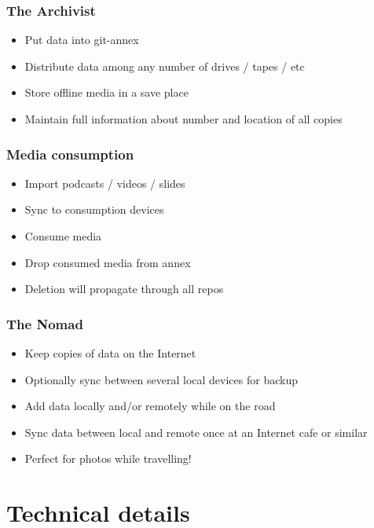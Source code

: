 \documentclass[t]{beamer}
\begin{document}
\begin{frame}
	\frametitle{The Archivist}
	\begin{itemize}
		\item Put data into git-annex
		\item Distribute data among any number of drives / tapes / etc
		\item Store offline media in a save place
		\item Maintain full information about number and location of all copies
	\end{itemize}
\end{frame}

\begin{frame}
	\frametitle{Media consumption}
	\begin{itemize}
		\item Import podcasts / videos / slides
		\item Sync to consumption devices
		\item Consume media
		\item Drop consumed media from annex
		\item Deletion will propagate through all repos
	\end{itemize}
\end{frame}

\begin{frame}
	\frametitle{The Nomad}
	\begin{itemize}
		\item Keep copies of data on the Internet
		\item Optionally sync between several local devices for backup
		\item Add data locally and/or remotely while on the road
		\item Sync data between local and remote once at an Internet cafe or similar
		\item Perfect for photos while travelling!
	\end{itemize}
\end{frame}


\section{Technical details}
\end{document}
